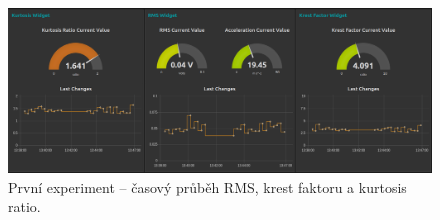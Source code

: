         \begin{figure}[!ht]
            \centering
    	    \includegraphics[width=\textwidth]{Experiment/Figs/timechanges_motor_nail.png}
            \caption {První experiment – časový průběh RMS, krest faktoru a kurtosis ratio.}
            \label{figure:experiment_graphs01}
        \end{figure}
        
